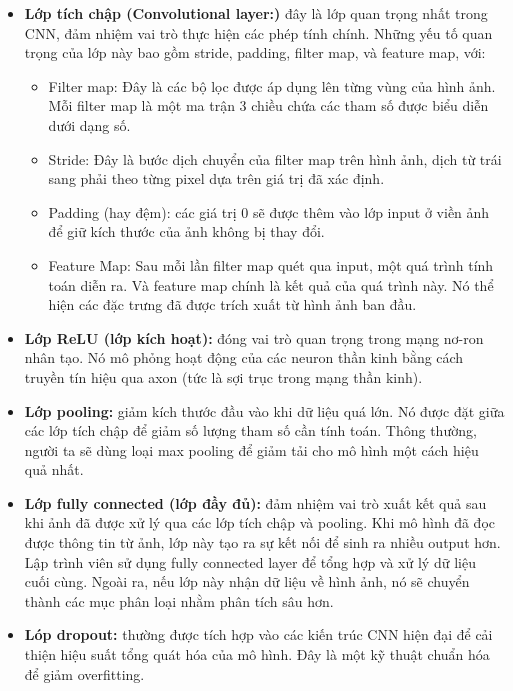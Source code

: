 \documentclass[../main.tex]{subfiles}
\begin{document}
\begin{itemize}
    \item \textbf{Lớp tích chập (Convolutional layer:)} đây là lớp quan trọng nhất trong CNN, đảm nhiệm vai trò thực hiện các phép tính chính. Những yếu tố quan trọng của lớp này bao gồm stride, padding, filter map, và feature map, với:
    \begin{itemize}
        \item Filter map: Đây là các bộ lọc được áp dụng lên từng vùng của hình ảnh. Mỗi filter map là một ma trận 3 chiều chứa các tham số được biểu diễn dưới dạng số.
        \item Stride: Đây là bước dịch chuyển của filter map trên hình ảnh, dịch từ trái sang phải theo từng pixel dựa trên giá trị đã xác định.
        \item Padding (hay đệm): các giá trị 0 sẽ được thêm vào lớp input ở viền ảnh để giữ kích thước của ảnh không bị thay đổi.
        \item  Feature Map: Sau mỗi lần filter map quét qua input, một quá trình tính toán diễn ra. Và feature map chính là kết quả của quá trình này. Nó thể hiện các đặc trưng đã được trích xuất từ hình ảnh ban đầu.
    \end{itemize}
    \item \textbf{Lớp ReLU (lớp kích hoạt):} đóng vai trò quan trọng trong mạng nơ-ron nhân tạo. Nó mô phỏng hoạt động của các neuron thần kinh bằng cách truyền tín hiệu qua axon (tức là sợi trục trong mạng thần kinh).
    \item \textbf{Lớp pooling:} giảm kích thước đầu vào khi dữ liệu quá lớn. Nó được đặt giữa các lớp tích chập để giảm số lượng tham số cần tính toán. Thông thường, người ta sẽ dùng loại max pooling để giảm tải cho mô hình một cách hiệu quả nhất.
    \item \textbf{Lớp fully connected (lớp đầy đủ):} đảm nhiệm vai trò xuất kết quả sau khi ảnh đã được xử lý qua các lớp tích chập và pooling. Khi mô hình đã đọc được thông tin từ ảnh, lớp này tạo ra sự kết nối để sinh ra nhiều output hơn. Lập trình viên sử dụng fully connected layer để tổng hợp và xử lý dữ liệu cuối cùng. Ngoài ra, nếu lớp này nhận dữ liệu về hình ảnh, nó sẽ chuyển thành các mục phân loại nhằm phân tích sâu hơn.
    \item \textbf{Lóp dropout:} thường được tích hợp vào các kiến trúc CNN hiện đại để cải thiện hiệu suất tổng quát hóa của mô hình. Đây là một kỹ thuật chuẩn hóa để giảm overfitting.
\end{itemize}
\end{document}
